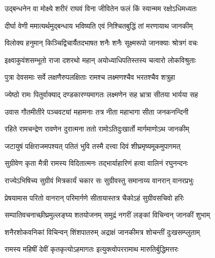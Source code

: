 
\textlink{}
\translink{}

\storymeta


\twolineshloka
{उद्बन्धनेन वा मोक्ष्ये शरीरं राघवं विना}
{जीवितेन फलं किं स्यान्मम रक्षोऽधिमध्यतः} %

\twolineshloka
{दीर्घा वेणी ममात्यर्थमुद्बन्धाय भविष्यति}
{एवं निश्चितबुद्धिं तां मरणायाथ जानकीम्} %

\twolineshloka
{विलोक्य हनुमान् किञ्चिद्विचार्यैतदभाषत}
{शनैः शनैः सूक्ष्मरूपो जानक्याः श्रोत्रगं वचः} %

\twolineshloka
{इक्ष्वाकुवंशसम्भूतो राजा दशरथो महान्}
{अयोध्याधिपतिस्तस्य चत्वारो लोकविश्रुताः} %

\twolineshloka
{पुत्रा देवसमाः सर्वे लक्षणैरुपलक्षिताः}
{रामश्च लक्ष्मणश्चैव भरतश्चैव शत्रुहा} %

\twolineshloka
{ज्येष्ठो रामः पितुर्वाक्याद् दण्डकारण्यमागतः}
{लक्ष्मणेन सह भ्रात्रा सीतया भार्यया सह} %

\twolineshloka
{उवास गौतमीतीरे पञ्चवट्यां महामनाः}
{तत्र नीता महाभागा सीता जनकनन्दिनी} %

\twolineshloka
{रहिते रामचन्द्रेण रावणेन दुरात्मना}
{ततो रामोऽतिदुःखार्तो मार्गमाणोऽथ जानकीम्} %

\twolineshloka
{जटायुषं पक्षिराजमपश्यत् पतितं भुवि}
{तस्मै दत्त्वा दिवं शीघ्रमृष्यमूकमुपागमत्} %

\twolineshloka
{सुग्रीवेण कृता मैत्री रामस्य विदितात्मनः}
{तद्भार्याहारिणं हत्वा वालिनं रघुनन्दनः} %

\twolineshloka
{राज्येऽभिषिच्य सुग्रीवं मित्रकार्यं चकार सः}
{सुग्रीवस्तु समानाय्य वानरान् वानरप्रभुः} %

\twolineshloka
{प्रेषयामास परितो वानरान् परिमार्गणे}
{सीतायास्तत्र चैकोऽहं सुग्रीवसचिवो हरिः} %

\twolineshloka
{सम्पातिवचनाच्छीघ्रमुल्लङ्घ्य शतयोजनम्}
{समुद्रं नगरीं लङ्कां विचिन्वन् जानकीं शुभाम्} %

\twolineshloka
{शनैरशोकवनिकां विचिन्वन् शिंशपातरुम्}
{अद्राक्षं जानकीमत्र शोचन्तीं दुःखसम्प्लुताम्} %

\twolineshloka
{रामस्य महिषीं देवीं कृतकृत्योऽहमागतः}
{इत्युक्त्वोपररामाथ मारुतिर्बुद्धिमत्तरः} %

